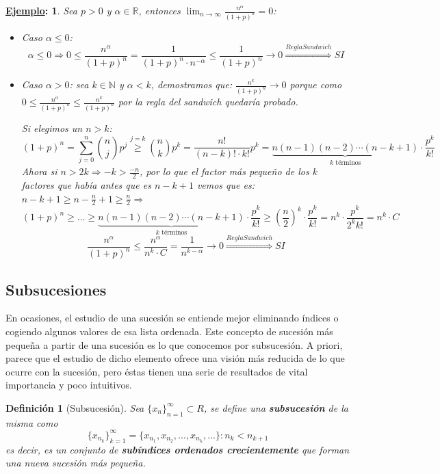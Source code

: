 \documentclass[10pt,a4paper,openright]{book}
\theoremstyle{break}
\newtheorem*{defi}{Definición}
\newtheorem*{ej}{\underline{Ejemplo}:}
\begin{document}
\begin{ej}
Sea $p>0$ y $\alpha\in \mathbb R$, entonces $\lim_{n\rightarrow\infty}\frac{n^\alpha}{(1+p)^n}=0$:
\begin{itemize}
\item Caso $\alpha\leq 0$:
$$\alpha\leq 0\Rightarrow 0\leq \frac{n^\alpha}{(1+p)^n}=\frac{1}{(1+p)^n\cdot n^{-\alpha}}\leq \frac{1}{(1+p)^n}\rightarrow 0\stackrel{Regla Sandwich}{\Rightarrow} SI$$

\item Caso $\alpha>0$: sea $k\in \mathbb N$ y $\alpha<k$, demostramos que: $\frac{n^k}{(1+p)^n}\rightarrow 0$ porque como  $0\leq \frac{n^\alpha}{(1+p)^n}\leq \frac{n^k}{(1+p)^n}$ por la regla del sandwich quedaría probado.\par

Si elegimos un $n>k$:
$$(1+p)^n=\sum_{j=0}^n \binom{n}{j} p^j \stackrel{j=k}{\geq} \binom{n}{k}p^k=\frac{n!}{(n-k)!\cdot k!}p^k=\underbrace{n(n-1)(n-2)\cdots(n-k+1)}_{k \mbox{ términos}}\cdot \frac{p^k}{k!}$$
Ahora si $n>2k\Rightarrow -k>\frac{-n}{2}$, por lo que el factor más pequeño de los $k$ factores que había antes que es $n-k+1$ vemos que es: $n-k+1\geq n-\frac{n}{2}+1\geq \frac{n}{2} \Rightarrow $
$$(1+p)^n\geq ... \geq \underbrace{n(n-1)(n-2)\cdots (n-k+1)}_{k \mbox{ términos}}\cdot \frac{p^k}{k!}\geq \left(\frac{n}{2}\right)^k\cdot \frac{p^k}{k!}=n^k\cdot \frac{p^k}{2^kk!}=n^k\cdot C$$
$$\frac{n^\alpha}{(1+p)^n}\leq \frac{n^\alpha}{n^k\cdot C}=\frac{1}{n^{k-\alpha}}\rightarrow 0\stackrel{Regla Sandwich}{\Rightarrow} SI$$
\end{itemize}
\end{ej}

\subsection{Subsucesiones}
En ocasiones, el estudio de una sucesión se entiende mejor eliminando índices o cogiendo algunos valores de esa lista ordenada. Este concepto de sucesión más pequeña a partir de una sucesión es lo que conocemos por subsucesión. A priori, parece que el estudio de dicho elemento ofrece una visión más reducida de lo que ocurre con la sucesión, pero éstas tienen una serie de resultados de vital importancia y poco intuitivos.

\begin{defi}[Subsucesión]
Sea $\{x_n\}_{n=1}^\infty\subset R$, se define una \textbf{subsucesión} de la misma como
$$\{x_{n_k}\}_{k=1}^\infty=\{x_{n_1}, x_{n_2}, ..., x_{n_k}, ...\}: n_k<n_{k+1}$$
es decir, es un conjunto de \textbf{subíndices ordenados crecientemente} que forman una nueva sucesión más pequeña.
\end{defi}
\end{document}
